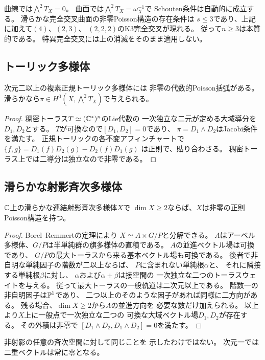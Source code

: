 \begin{remark}[曲線と曲面]\label{rem:ci-small-dimension}
曲線では$\bigwedge^2T_X=0$。
曲面では$\bigwedge^2T_X=\omega_X^{-1}$で
Schouten条件は自動的に成立する。
滑らかな完全交叉曲面の非零Poisson構造の存在条件は
$s\le3$であり、上記に加えて$(4)$、$(2,3)$、
$(2,2,2)$のK3完全交叉が現れる。
従って$n\ge3$は本質的である。
特異完全交叉には上の消滅をそのまま適用しない。
\end{remark}

\subsection{トーリック多様体}
\begin{proposition}\label{prop:toric-poisson}
次元二以上の複素正規トーリック多様体には
非零の代数的Poisson括弧がある。
滑らかなら$\pi\in H^0(X,\bigwedge^2T_X)$で与えられる。
\end{proposition}
\begin{proof}
稠密トーラス$T\simeq(\mathbb C^*)^n$のLie代数の
一次独立な二元が定める大域導分を$D_1,D_2$とする。
$T$が可換なので$[D_1,D_2]=0$であり、
$\pi=D_1\wedge D_2$はJacobi条件を満たす。
正規トーリックの各不変アフィンチャートで
$\{f,g\}=D_1(f)D_2(g)-D_2(f)D_1(g)$
は正則で、貼り合わさる。
稠密トーラス上では二導分は独立なので非零である。
\end{proof}

\subsection{滑らかな射影斉次多様体}
\begin{theorem}\label{thm:homogeneous-poisson}
$\mathbb C$上の滑らかな連結射影斉次多様体$X$で
$\dim X\ge2$ならば、$X$は非零の正則Poisson構造を持つ。
\end{theorem}
\begin{proof}
Borel--Remmertの定理\cite{BorelRemmert}により
$X\simeq A\times G/P$と分解できる。
$A$はアーベル多様体、$G/P$は半単純群の旗多様体の直積である。
$A$の並進ベクトル場は可換であり、
$G/P$の最大トーラスから来る基本ベクトル場も可換である。
後者で非自明な単純因子の階数が二以上ならば、
$P$に含まれない単純根$\alpha$と、
それに隣接する単純根$\beta$に対し、
$\alpha$および$\alpha+\beta$は接空間の
一次独立な二つのトーラスウェイトを与える。
従って最大トーラスの一般軌道は二次元以上である。
階数一の非自明因子は$\mathbb P^1$であり、
二つ以上のそのような因子があれば同様に二方向がある。
残る場合、$\dim X\ge2$から$A$の並進方向を
必要な数だけ加えられる。
以上より$X$上に一般点で一次独立な二つの
可換な大域ベクトル場$D_1,D_2$が存在する。
その外積は非零で
$[D_1\wedge D_2,D_1\wedge D_2]=0$を満たす。
\end{proof}
\begin{remark}
非射影の任意の斉次空間に対して同じことを
示したわけではない。
次元一では二重ベクトルは常に零となる。
\end{remark}

